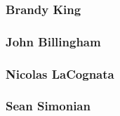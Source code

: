 
\subsubsection{Brandy King}


\subsubsection{John Billingham}


\subsubsection{Nicolas LaCognata}


\subsubsection{Sean Simonian}


